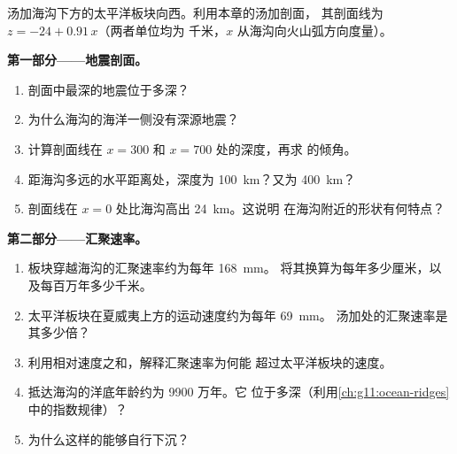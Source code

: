 \begin{problem}
\label{pb:g11:subduction-zones:1}
汤加海沟下方的太平洋板块向西。利用本章的汤加剖面，
其剖面线为 $z = -24 + 0.91\,x$（两者单位均为
千米，$x$ 从海沟向火山弧方向度量）。

\medskip
\noindent\textbf{第一部分——地震剖面。}
\begin{enumerate}
  \item 剖面中最深的地震位于多深？
  \item 为什么海沟的海洋一侧没有深源地震？
  \item 计算剖面线在 $x = 300$ 和 $x = 700$ 处的深度，再求
        的倾角。
  \item 距海沟多远的水平距离处，深度为
        \qty{100}{km}？又为 \qty{400}{km}？
  \item 剖面线在 $x = 0$ 处比海沟高出 \qty{24}{km}。这说明
        在海沟附近的形状有何特点？
\end{enumerate}

\medskip
\noindent\textbf{第二部分——汇聚速率。}
\begin{enumerate}[resume]
  \item 板块穿越海沟的汇聚速率约为每年 \qty{168}{mm}。
        将其换算为每年多少厘米，以及每百万年多少千米。
  \item 太平洋板块在夏威夷上方的运动速度约为每年 \qty{69}{mm}。
        汤加处的汇聚速率是其多少倍？
  \item 利用相对速度之和，解释汇聚速率为何能
        超过太平洋板块的速度。
  \item 抵达海沟的洋底年龄约为 9900 万年。它
        位于多深（利用\cref{ch:g11:ocean-ridges}中的指数规律）？
  \item 为什么这样的能够自行下沉？
\end{enumerate}


\end{problem}
